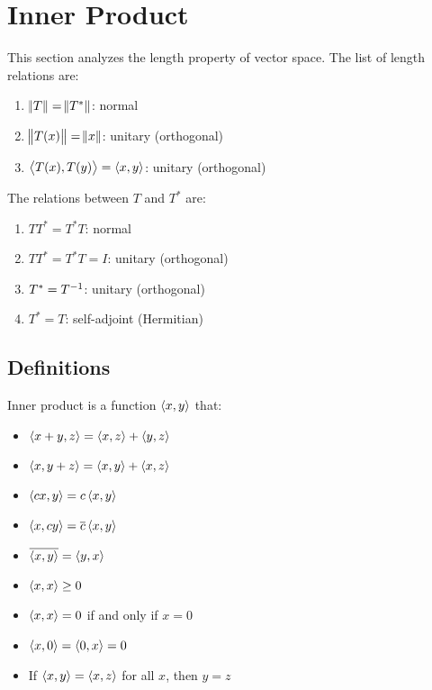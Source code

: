 \section{Inner Product}

This section analyzes the length property of vector space. The list of length relations are:
\begin{enumerate}
    \item $\norm{T} = \norm{T^*}$: normal
    \item $\norm{T(x)} = \norm{x}$: unitary (orthogonal)
    \item $\left\langle \displaystyle T(x), T(y) \right\rangle = \left\langle \displaystyle x, y \right\rangle$: unitary (orthogonal)
\end{enumerate}

The relations between $T$ and $T^*$ are:
\begin{enumerate}
    \item $TT^* = T^*T$: normal
    \item $TT^* = T^*T = I$: unitary (orthogonal)
    \item $T^* = {T}^{-1}$: unitary (orthogonal)
    \item $T^* = T$: self-adjoint (Hermitian)
\end{enumerate}



\subsection{Definitions}

Inner product is a function $\left\langle \displaystyle x, y \right\rangle$ that:
\begin{itemize}
    \item $\left\langle \displaystyle x + y, z \right\rangle = \left\langle \displaystyle x, z \right\rangle + \left\langle \displaystyle y, z \right\rangle$    
    \item $\left\langle \displaystyle x, y+z \right\rangle = \left\langle \displaystyle x, y \right\rangle + \left\langle \displaystyle x, z \right\rangle$
    \item $\left\langle \displaystyle cx, y \right\rangle = c \left\langle \displaystyle x, y \right\rangle$
    \item $\left\langle \displaystyle x, cy \right\rangle = \overline{c} \left\langle \displaystyle x, y \right\rangle$
    \item $\overline{\left\langle \displaystyle x, y \right\rangle} = \left\langle \displaystyle y, x \right\rangle$
    \item $\left\langle \displaystyle x, x \right\rangle \geq 0$
    \item $\left\langle \displaystyle x, x \right\rangle = 0$ if and only if $x = 0$
    \item $\left\langle \displaystyle x, 0 \right\rangle = \left\langle \displaystyle 0, x \right\rangle = 0$
    \item If $\left\langle \displaystyle x, y \right\rangle = \left\langle \displaystyle x, z \right\rangle$ for all $x$, then $y = z$
\end{itemize}

